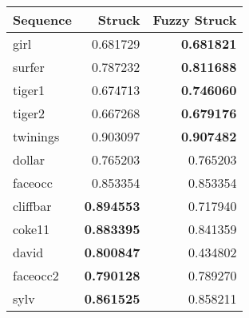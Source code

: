 \begin{center}

\begin{tabular}{l r r}
    \toprule
    Sequence & Struck & Fuzzy Struck \\
    \midrule
    girl     &         0.681729  & \textbf{0.681821} \\
    surfer   &         0.787232  & \textbf{0.811688} \\
    tiger1   &         0.674713  & \textbf{0.746060} \\
    tiger2   &         0.667268  & \textbf{0.679176} \\
    twinings &         0.903097  & \textbf{0.907482} \\
    dollar   &         0.765203  &         0.765203  \\
    faceocc  &         0.853354  &         0.853354  \\
    cliffbar & \textbf{0.894553} &         0.717940  \\
    coke11   & \textbf{0.883395} &         0.841359  \\
    david    & \textbf{0.800847} &         0.434802  \\
    faceocc2 & \textbf{0.790128} &         0.789270  \\
    sylv     & \textbf{0.861525} &         0.858211  \\
    \bottomrule
\end{tabular}
\end{center}
